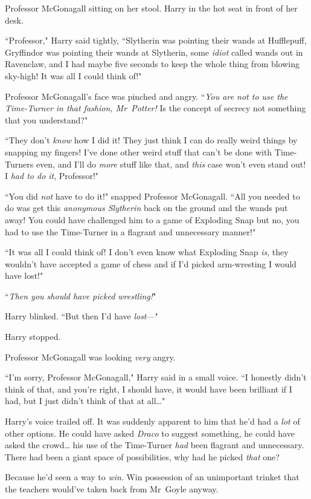 Professor McGonagall sitting on her stool. Harry in the hot seat in front of her desk.

``Professor," Harry said tightly, ``Slytherin was pointing their wands at Hufflepuff, Gryffindor was pointing their wands at Slytherin, some \emph{idiot} called wands out in Ravenclaw, and I had maybe five seconds to keep the whole thing from blowing sky-high! It was all I could think of!"

Professor McGonagall's face was pinched and angry. ``\emph{You are not to use the Time-Turner in that fashion, Mr~Potter!} Is the concept of secrecy not something that you understand?"

``They don't \emph{know} how I did it! They just think I can do really weird things by snapping my fingers! I've done other weird stuff that can't be done with Time-Turners even, and I'll do \emph{more} stuff like that, and \emph{this} case won't even stand out! I \emph{had to do it}, Professor!"

``You did \emph{not} have to do it!" snapped Professor McGonagall. ``All you needed to do was get this \emph{anonymous Slytherin} back on the ground and the wands put away! You could have challenged him to a game of Exploding Snap but no, you had to use the Time-Turner in a flagrant and unnecessary manner!"

``It was all I could think of! I don't even know what Exploding Snap \emph{is}, they wouldn't have accepted a game of chess and if I'd picked arm-wresting I would have lost!"

``\emph{Then you should have picked wrestling!}"

Harry blinked. ``But then I'd have \emph{lost}—"

Harry stopped.

Professor McGonagall was looking \emph{very} angry.

``I'm sorry, Professor McGonagall," Harry said in a small voice. ``I honestly didn't think of that, and you're right, I should have, it would have been brilliant if I had, but I just didn't think of that at all{\ldots}"

Harry's voice trailed off. It was suddenly apparent to him that he'd had a \emph{lot} of other options. He could have asked \emph{Draco} to suggest something, he could have asked the crowd{\ldots} his use of the Time-Turner \emph{had} been flagrant and unnecessary. There had been a giant space of possibilities, why had he picked \emph{that} one?

Because he'd seen a way to \emph{win}. Win possession of an unimportant trinket that the teachers would've taken back from Mr~Goyle anyway.

